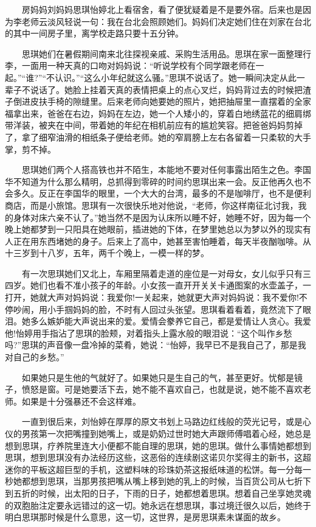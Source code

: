 \documentclass[12pt,UTF8]{ctexbook}
\begin{document}
　　房妈妈刘妈妈思琪怡婷北上看宿舍，看了便犹疑着是不是要外宿。后来也是因为李老师云淡风轻说一句：我在台北会照顾她们。妈妈们决定她们住在刘家在台北的其中一间房子里，离学校走路只要十五分钟。

　　思琪她们在暑假期间南来北往探视亲戚、采购生活用品。思琪在家一面整理行李，一面用一种天真的口吻对妈妈说：\enquote{听说学校有个同学跟老师在一起。}\enquote{谁?}\enquote{不认识。}\enquote{这么小年纪就这么骚。}思琪不说话了。她一瞬间决定从此一辈子不说话了。她脸上挂着天真的表情把桌上的点心叉烂，妈妈背过去的时候把渣子倒进皮扶手椅的隙缝里。后来老师向她要她的照片，她把抽屉里一直摆着的全家福拿出来，爸爸在右边，妈妈在左边，她一个人矮小的，穿着白地绣蓝花的细肩绑带洋装，被夹在中间，带着她的年纪在相机前应有的尴尬笑容。把爸爸妈妈剪掉了，拿了细窄油滑的相纸条子便给老师。她的窄肩膀上左右各留着一只柔软的大手掌，剪不掉。

　　思琪她们两个人搭高铁也并不陌生，本能地不要对任何事露出陌生之色。李国华不知道为什么那么精明，总抓得到零碎的时间约思琪出来一会。反正他再久也不会多久。反正在李国华的眼里，一个大大的台湾，最多的不是咖啡厅，也不是便利商店，而是小旅馆。思琪有一次很快乐地对他说，\enquote{老师，你这样南征北讨我，我的身体对床六亲不认了。}她当然不是因为认床所以睡不好，她睡不好，因为每一个晚上她都梦到一只阳具在她眼前，插进她的下体，在梦里她总以为梦以外的现实有人正在用东西堵她的身子。后来上了高中，她甚至害怕睡着，每天半夜酗咖啡。从十三岁到十八岁，五年，两千个晚上，一模一样的梦。

　　有一次思琪她们又北上，车厢里隔着走道的座位是一对母女，女儿似乎只有三四岁。她们也看不准小孩子的年龄。小女孩一直开开关关卡通图案的水壶盖子，一打开，她就大声对妈妈说：我爱你!一关起来，她就更大声对妈妈说：我不爱你!不停吵闹，用小手掴妈妈的脸，不时有人回过头张望。思琪看着看着，竟然流下了眼泪。她多么嫉妒能大声说出来的爱。爱情会豢养它自己，都是爱情让人贪心。我爱他!怡婷用手指沾了思琪的脸颊，对着指头上露水般的眼泪说：\enquote{这个叫作乡愁吗?}思琪的声音像一盘冷掉的菜肴，她说：\enquote{怡婷，我早已不是我自己了，那是我对自己的乡愁。}

　　如果她只是生他的气就好了。如果她只是生自己的气，甚至更好。忧郁是镜子，愤怒是窗。可是她要活下去，她不能不喜欢自己，也就是说，她不能不喜欢老师。如果是十分强暴还不会这样难。

　　一直到很后来，刘怡婷在厚厚的原文书划上马路边红线般的荧光记号，或是心仪的男孩第一次把嘴撞到她嘴上，或是奶奶过世时她大声跟师傅唱着心经，她总是想到思琪，疗养院里连大小便都不能自理的思琪，她的思琪。做什么事情她都想到思琪，想到思琪没有办法经历这些，这恶俗的连续剧这诺贝尔奖得主的新书，这超迷你的平板这超巨型的手机，这塑料味的珍珠奶茶这报纸味道的松饼。每一分每一秒她都想到思琪，当那男孩把嘴从嘴上移到她的乳上的时候，当百货公司从七折下到五折的时候，出太阳的日子，下雨的日子，她都想着思琪。想着自己坐享她灵魂的双胞胎注定要永远错过的这一切。她永远在想思琪，事过境迁很久以后，她终于明白思琪那时候是什么意思，这一切，这世界，是房思琪素未谋面的故乡。
\end{document}

